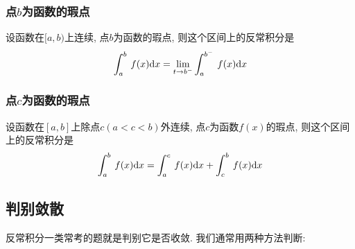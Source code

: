 \subsubsection{点$ b $为函数的瑕点}
设函数在$ [a,b) $上连续, 点$ b $为函数的瑕点, 则这个区间上的反常积分是
                \begin{equation*}
                    \displaystyle\int_{a}^{b}\hspace{.2em}f(x)\mathrm{d}x=\lim\limits_{t \rightarrow b^{-}}\displaystyle\int_{a}^{b^{-}}\hspace{.2em}f(x)\mathrm{d}x
                \end{equation*}
                \subsubsection{点$ c $为函数的瑕点}
                设函数在$ [a,b] $上除点$ c(a<c<b) $外连续, 点$ c $为函数$ f(x) $的瑕点, 则这个区间上的反常积分是
                \begin{equation*}
                    \displaystyle\int_{a}^{b}\hspace{.2em}f(x)\mathrm{d}x=\displaystyle\int_{a}^{c}\hspace{.2em}f(x)\mathrm{d}x+\displaystyle\int_{c}^{b}\hspace{.2em}f(x)\mathrm{d}x
                \end{equation*}
                \subsection{判别敛散}
                反常积分一类常考的题就是判别它是否收敛. 我们通常用两种方法判断:
